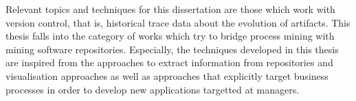 Relevant topics and techniques for this dissertation are those which work with version control, that is, historical trace data about the evolution of artifacts. This thesis falls into the category of works which try to bridge process mining with mining software repositories. 
Especially, the techniques developed in this thesis are inspired from the approaches to extract information from repositories \citep{DBLP:conf/msr/GousiosS12,DBLP:journals/ese/VasilescuSGM14} and visualisation approaches \citep{DAmbros2009} as well as approaches that explicitly target business processes \citep{DBLP:conf/csmr/PoncinSB11,DBLP:conf/oopsla/PoncinSB11} in order to develop new applications targetted at managers. 


%


%
%
%


